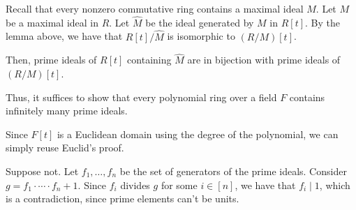 \documentclass{article}
\theoremstyle{definition}
\begin{document}
Recall that every nonzero commutative ring contains a maximal ideal $ M $.
Let $ M $ be a maximal ideal in $ R $.
Let $ \hat{M} $ be the ideal generated by $ M $ in $ R[t] $.
By the lemma above, we have that $ R[t] / \hat{M} $ is isomorphic to $ (R/M)[t] $.

Then, prime ideals of $ R[t] $ containing $ \hat{M} $ are in bijection with prime ideals
of $ (R/M)[t] $.

Thus, it suffices to show that every polynomial ring over a field $ F $ contains infinitely many prime ideals.

Since $ F[t] $ is a Euclidean domain using the degree of the polynomial, we can simply reuse Euclid's proof.

Suppose not. Let $ f_{1}, \ldots, f_{n} $ be the set of generators of the prime ideals.
Consider $ g = f_{1} \cdot \cdots \cdot f_{n}  + 1 $.
Since $ f_{i} $ divides $ g $ for some $ i \in [n] $, we have that $ f_{i} \mid 1 $, which is a contradiction,
since prime elements can't be units.
\end{document}

